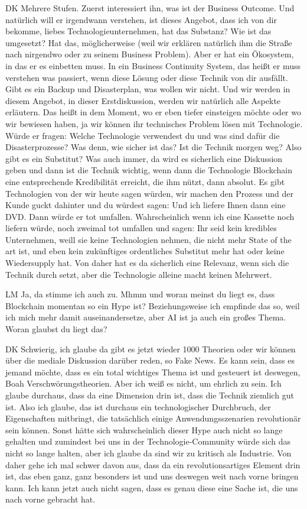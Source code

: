 \begin{xlist}
     \item[DK] Mehrere Stufen. Zuerst interessiert ihn, was ist der Business Outcome. Und natürlich will er irgendwann verstehen, ist dieses Angebot, dass ich von dir bekomme, liebes Technologieunternehmen, hat das Substanz? Wie ist das umgesetzt? Hat das, möglicherweise (weil wir erklären natürlich ihm die Straße nach nirgendwo oder zu seinem Business Problem). Aber er hat ein Ökosystem, in das er es einbetten muss. In ein Business Continuity System, das heißt er muss verstehen was passiert, wenn diese Lösung oder diese Technik von dir ausfällt. Gibt es ein Backup und Disasterplan, was wollen wir nicht. Und wir werden in diesem Angebot, in dieser Erstdiskussion, werden wir natürlich alle Aspekte erläutern. Das heißt in dem Moment, wo er eben tiefer einsteigen möchte oder wo wir bewiesen haben, ja wir können ihr technisches Problem lösen mit Technologie. Würde er fragen: Welche Technologie verwendest du und was sind dafür die Disasterprozesse? Was denn, wie sicher ist das? Ist die Technik morgen weg? Also gibt es ein Substitut? Was auch immer, da wird es sicherlich eine Diskussion geben und dann ist die Technik wichtig, wenn dann die Technologie Blockchain eine entsprechende Kredibilität erreicht, die ihm nützt, dann absolut. Es gibt Technologien von der wir heute sagen würden, wir machen den Prozess und der Kunde guckt dahinter und du würdest sagen: Und ich liefere Ihnen dann eine DVD. Dann würde er tot umfallen. Wahrscheinlich wenn ich eine Kassette noch liefern würde, noch zweimal tot umfallen und sagen: Ihr seid kein kredibles Unternehmen, weill sie keine Technologien nehmen, die nicht mehr State of the art ist, und eben kein zukünftiges ordentliches Substitut mehr hat oder keine Wiedersupply hat. Von daher hat es da sicherlich eine Relevanz, wenn sich die Technik durch setzt, aber die Technologie alleine macht keinen Mehrwert.
     \item[LM] Ja, da stimme ich auch zu. Mhmm und woran meinst du liegt es, dass Blockchain momentan so ein Hype ist? Beziehungsweise ich empfinde das so, weil ich mich mehr damit auseinandersetze, aber AI ist ja auch ein großes Thema. Woran glaubst du liegt das?
     \item[DK] Schwierig, ich glaube da gibt es jetzt wieder 1000 Theorien oder wir können über die mediale Diskussion darüber reden, so Fake News. Es kann sein, dass es jemand möchte, dass es ein total wichtiges Thema ist und gesteuert ist deswegen, Boah Verschwörungstheorien. Aber ich weiß es nicht, um ehrlich zu sein. Ich glaube durchaus, dass da eine Dimension drin ist, dass die Technik ziemlich gut ist. Also ich glaube, das ist durchaus ein technologischer Durchbruch, der Eigenschaften mitbringt, die tatsächlich einige Anwendungsszenarien revolutionär sein können. Sonst hätte sich wahrscheinlich dieser Hype auch nicht so lange gehalten und zumindest bei uns in der Technologie-Community würde sich das nicht so lange halten, aber ich glaube da sind wir zu kritisch als Industrie. Von daher gehe ich mal schwer davon aus, dass da ein revolutionsartiges Element drin ist, das eben ganz, ganz besonders ist und uns deswegen weit nach vorne bringen kann. Ich kann jetzt auch nicht sagen, dass es genau diese eine Sache ist, die uns nach vorne gebracht hat. 

\end{xlist}
